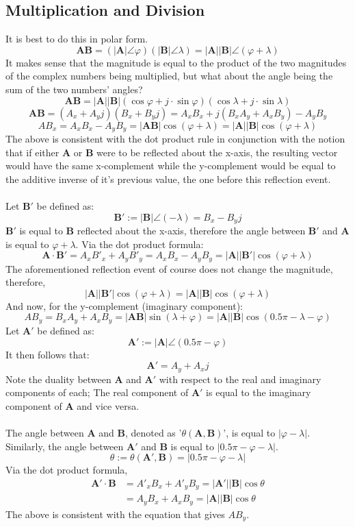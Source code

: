 \documentclass{article}
\begin{document}
	\subsection[Multiplication]{Multiplication and Division}
	It is best to do this in polar form.
	$$\mathbf{A}\mathbf{B}=(|\mathbf{A}|\angle\varphi)(|\mathbf{B}|\angle\lambda)=|\mathbf{A}|
	|\mathbf{B}|\angle(\varphi+\lambda)$$
	It makes sense that the magnitude is equal to the product of the two 
	magnitudes of the complex numbers being multiplied, but what about the 
	angle being the sum of the two numbers' angles?
	$$ 
	\mathbf{A}\mathbf{B}=|\mathbf{A}||\mathbf{B}|(\cos\varphi+j\cdot\sin\varphi)(\cos\lambda
	 + 
	j\cdot\sin\lambda)$$
	$$\mathbf{A}\mathbf{B}= (A_x+A_yj)(B_x+B_yj) = A_xB_x + j(B_xA_y + A_xB_y) 
	- A_yB_y$$
	$$ AB_x = A_xB_x - A_yB_y = |\mathbf{AB}|\cos(\varphi + \lambda) = 
	|\mathbf{A}||\mathbf{B}|\cos(\varphi + \lambda)$$
	The above is consistent with the dot product rule in conjunction with the 
	notion that if either $\mathbf{A}$ or $\mathbf{B}$ were to be reflected 
	about the x-axis, the resulting vector would have the same x-complement 
	while the y-complement would be equal to the additive inverse of it's 
	previous value, the one before this reflection event. \\ \\
	Let $\mathbf{B'}$ be defined as:
	$$\mathbf{B'}:=|\mathbf{B}|\angle(-\lambda)=B_x-B_yj$$
	$\mathbf{B'}$ is equal to $\mathbf{B}$ reflected about the x-axis, 
	therefore the angle between $\mathbf{B'}$ and $\mathbf{A}$ is equal to 
	$\varphi+\lambda$.  Via the dot product formula:
	$$ \mathbf{A\cdot B'} = A_xB'_x + A_yB'_y = A_xB_x-A_yB_y = 
	|\mathbf{A}||\mathbf{B'}|\cos(\varphi+\lambda)$$
	The aforementioned reflection event of course does not change the 
	magnitude, therefore,
	$$ |\mathbf{A}||\mathbf{B'}|\cos(\varphi+\lambda) = 
	|\mathbf{A}||\mathbf{B}|\cos(\varphi+\lambda)$$
	And now, for the y-complement (imaginary component):
	$$ AB_y = B_xA_y + A_xB_y = |\mathbf{AB}|\sin(\lambda+\varphi) = 
	|\mathbf{A}||\mathbf{B}|\cos(0.5\pi - \lambda - \varphi)$$
	Let $\mathbf{A'}$ be defined as:
	$$ \mathbf{A'} := |\mathbf{A}|\angle(0.5\pi - \varphi)$$
	It then follows that:
	$$ \mathbf{A'} = A_y + A_xj$$
	Note the duality between $\mathbf{A}$ and $\mathbf{A'}$ with respect to the 
	real and imaginary components of each;  The real component of $\mathbf{A'}$ 
	is equal to the imaginary component of $\mathbf{A}$ and vice versa. \\ \\
	The angle between $\mathbf{A}$ and $\mathbf{B}$, denoted as 
	'$\theta(\mathbf{A},\mathbf{B})$', is equal to $|\varphi-\lambda|$.  
	Similarly, the angle between $\mathbf{A'}$ and $\mathbf{B}$ is equal to 
	$|0.5\pi-\varphi-\lambda|$.
	$$ \theta:=\theta(\mathbf{A'},\mathbf{B})=|0.5\pi-\varphi-\lambda|$$
	Via the dot product formula,
	\begin{align*}
		\mathbf{A'\cdot B} &= A'_xB_x + 
		A'_yB_y=|\mathbf{A'}||\mathbf{B}|\cos\theta \\
		 &= A_yB_x + A_xB_y = |\mathbf{A}||\mathbf{B}|\cos\theta
	\end{align*}
	The above is consistent with the equation that gives $AB_y$.
\end{document}
